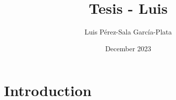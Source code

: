 \documentclass{article}
\title{Tesis - Luis}
\author{Luis Pérez-Sala García-Plata}
\date{December 2023}
\begin{document}
\maketitle

\section{Introduction}
\end{document}
